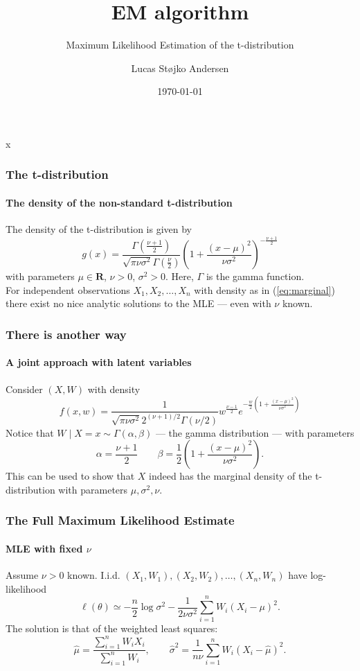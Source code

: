 \documentclass[aspectratio=169]{beamer}
\title{EM algorithm}
\subtitle{Maximum Likelihood Estimation of the t-distribution}
\author{Lucas Støjko Andersen}
\institute{University of Copenhagen}
\date{\today}
\begin{document}
\begin{frame}
    \titlepage
\end{frame}
\begin{frame} x
    \frametitle{The t-distribution}
    \framesubtitle{The density of the non-standard t-distribution}
    The density of the t-distribution is given by
    \begin{equation}
        \label{eq:marginal}
        g(x)=\frac{\Gamma\left(\frac{\nu + 1}{2}\right)}{\sqrt{\pi\nu\sigma^2}\Gamma\left(\frac{\nu}{2}\right)}\left(1+\frac{(x - \mu)^2}{\nu\sigma^2}\right)^{-\frac{\nu + 1}{2}}
    \end{equation}
    with parameters $\mu\in\mathbf{R}$, $\nu > 0$, $\sigma^2 > 0$. Here, $\Gamma$ is the gamma function.\\[12pt]
    For independent observations $X_{1},X_{2},\ldots,X_{n}$ with density as in (\ref{eq:marginal}) there exist no nice analytic solutions to the MLE --- even with $\nu$ known.
\end{frame}
\begin{frame}
    \frametitle{There is another way}
    \framesubtitle{A joint approach with latent variables}
    Consider $(X, W)$ with density
    \begin{equation}
        \label{eq:join}
        f(x,w)=\frac{1}{\sqrt{\pi\nu\sigma^2}2^{(\nu+1)/2}\Gamma(\nu/2)}w^{\frac{\nu - 1}{2}}e^{-\frac{w}{2}\left(1+\frac{(x -\mu)^2}{\nu\sigma^2}\right)}
    \end{equation}
    Notice that $W\mid X = x \sim \Gamma(\alpha, \beta)$ --- the gamma distribution --- with parameters
    \begin{equation}
        \alpha = \frac{\nu + 1}{2} \quad\quad 
        \beta = \frac{1}{2}\left(1+\frac{(x -\mu)^2}{\nu\sigma^2}\right).
    \end{equation}
    This can be used to show that $X$ indeed has the marginal density of the t-distribution with parameters $\mu,\sigma^2,\nu$.
\end{frame}
\begin{frame}
    \frametitle{The Full Maximum Likelihood Estimate}
    \framesubtitle{MLE with fixed $\nu$}
    Assume $\nu>0$ known. I.i.d. $(X_{1},W_{1}), (X_{2},W_{2}),\ldots,(X_{n},W_{n})$ have log-likelihood
    \begin{equation}
        \ell(\theta)\simeq -\frac{n}{2}\log\sigma^2 -\frac{1}{2\nu\sigma^2}\sum_{i=1}^{n}W_{i}(X_{i}-\mu)^{2}.
    \end{equation}
    The solution is that of the weighted least squares:
    \begin{equation}
        \hat\mu =\frac{\sum_{i=1}^{n}W_{i}X_{i}}{\sum_{i=1}^{n}W_{i}},\quad\quad \hat\sigma^2 = \frac{1}{n\nu}\sum_{i=1}^{n}W_{i}(X_{i}-\hat\mu)^{2}.
    \end{equation}
\end{frame}
\end{document}
